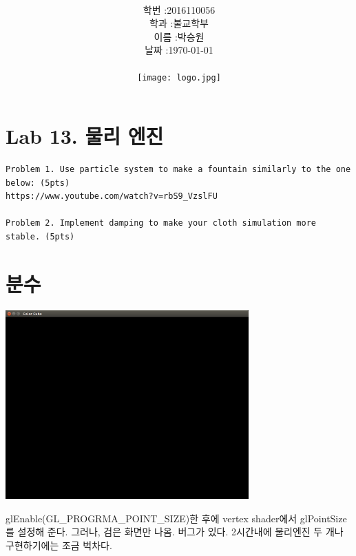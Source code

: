 \documentclass[12pt,a4paper]{article}
\title{
	\centering
	\pgfornament[width=12cm,color=teal]{84}\\
	\vspace{1cm}
	\fontsize{50}{50} \selectfont {컴퓨터 그래픽스 입문}\\
		\pgfornament[width=12cm,color=teal]{88}\\
	\vfill}
\author{
	\LARGE
	\begin{tabular}{rl}
		\hline
		학번 : & 2016110056\\ 
		학과 : & 불교학부 \\
		이름 : & 박승원\\
		날짜 : & \today\\
		\hline
	\end{tabular}\vspace{2cm}
	\\
\texttt{[image: logo.jpg]}
	}
\date{}
\begin{document}
\maketitle
{}
\noindent
\lstset{language=C++, columns=flexible, tabsize=4, frame=shadowbox, showstringspaces=false, breaklines=true, upquote=true, basicstyle=\normalsize}
\newpage
\section*{Lab 13. 물리 엔진}
	
\begin{verbatim}
Problem 1. Use particle system to make a fountain similarly to the one
below: (5pts)
https://www.youtube.com/watch?v=rbS9_VzslFU

Problem 2. Implement damping to make your cloth simulation more stable. (5pts)\end{verbatim}
\section{분수}



\includegraphics[width=0.7\textwidth]{2.png}

glEnable(GL\_PROGRMA\_POINT\_SIZE)한 후에 vertex shader에서 glPointSize를 설정해 준다.
그러나, 검은 화면만 나옴. 
버그가 있다.
2시간내에 물리엔진 두 개나 구현하기에는 조금 벅차다.
\end{document}
